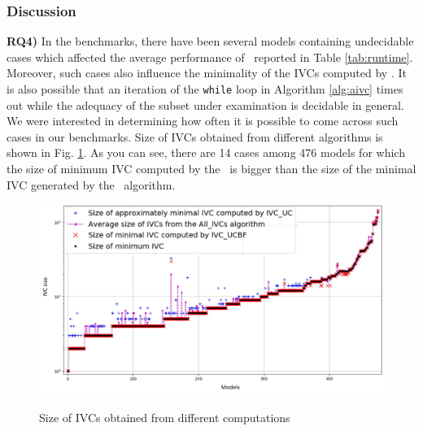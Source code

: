 \subsubsection {Discussion}
\label{sec:experiment-discussion}
\textbf{RQ4)} In the benchmarks, there have been
several models containing undecidable cases which affected the average
performance of \aivcalg ~reported in Table \ref{tab:runtime}. Moreover, such cases also influence the minimality of the IVCs computed by \aivcalg. It is also possible that an iteration of
the \texttt{while} loop in Algorithm \ref{alg:aivc} times out while
the adequacy of the subset under examination is decidable in general.
We were interested in determining how often it is possible to come across such cases in our benchmarks. Size of IVCs obtained from different algorithms is shown in Fig. \ref{fig:min}.
As you can see, there are 14 cases among 476 models for which the size of
 minimum IVC computed by the \aivcalg ~is bigger than the size of the minimal IVC
 generated by the \ucbfalg ~algorithm.
 \begin{figure}
 \centering
  \includegraphics[width=\textwidth]{figs/min.jpg}
  \label{fig:min}
  \vspace{-0.2in}
  \caption{Size of IVCs obtained from different computations}
\end{figure}
